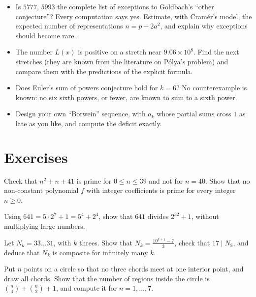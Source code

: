 \begin{itemize}
\item Is $5777$, $5993$ the complete list of exceptions to Goldbach's ``other conjecture''? Every computation says yes. Estimate, with Cram\'er's model, the expected
number of representations $n=p+2a^2$, and explain why exceptions should become rare.
\item The number $L(x)$ is positive on a stretch near $9.06\times10^8$. Find the next stretches (they are known from the literature on P\'olya's problem) and
compare them with the predictions of the explicit formula.
\item Does Euler's sum of powers conjecture hold for $k=6$? No counterexample is known: no six sixth powers, or fewer, are known to sum to a sixth power.
\item Design your own ``Borwein'' sequence, with $a_k$ whose partial sums cross $1$ as late as you like, and compute the deficit exactly.
\end{itemize}

\section{Exercises}

\begin{exercise}[$\star$]\label{ex:euler41}
Check that $n^2+n+41$ is prime for $0\le n\le39$ and not for $n=40$. Show that no non-constant polynomial $f$ with integer coefficients is prime for every
integer $n\ge0$.
\end{exercise}

\begin{exercise}[$\star$]\label{ex:fermat641}
Using $641=5\cdot2^7+1=5^4+2^4$, show that $641$ divides $2^{32}+1$, without multiplying large numbers.
\end{exercise}

\begin{exercise}[$\star$]\label{ex:threes}
Let $N_k=33\ldots31$, with $k$ threes. Show that $N_k=\frac{10^{k+1}-7}3$, check that $17\mid N_8$, and deduce that $N_k$ is composite for infinitely many $k$.
\end{exercise}

\begin{exercise}[$\star\star$]\label{ex:moser}
Put $n$ points on a circle so that no three chords meet at one interior point, and draw all chords. Show that the number of regions inside the circle is
$\binom n4+\binom n2+1$, and compute it for $n=1,\dots,7$.
\end{exercise}

